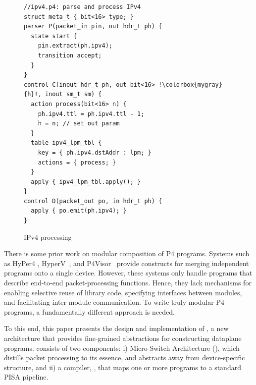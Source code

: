 \documentclass[letterpaper,twocolumn,10pt]{article}
\begin{document}
\begin{figure}[ht]
\begin{lstlisting}[frame=none, escapechar=!]
//ipv4.p4: parse and process IPv4
struct meta_t { bit<16> type; }
parser P(packet_in pin, out hdr_t ph) {
  state start {
    pin.extract(ph.ipv4);
    transition accept;
  }
}
control C(inout hdr_t ph, out bit<16> !\colorbox{mygray}{h}!, inout sm_t sm) {
  action process(bit<16> n) {
    ph.ipv4.ttl = ph.ipv4.ttl - 1;
    h = n; // set out param
  }
  table ipv4_lpm_tbl {
    key = { ph.ipv4.dstAddr : lpm; }
    actions = { process; }
  }
  apply { ipv4_lpm_tbl.apply(); }
}
control D(packet_out po, in hdr_t ph) {
  apply { po.emit(ph.ipv4); }
}
\end{lstlisting}
\caption{IPv4 processing}
\label{fig:ipv4.p4}
\end{figure}



There is some prior work on modular composition of P4 programs.
Systems such as HyPer4 \cite{Hancock:2016:HUP:2999572.2999607},
HyperV~\cite{8038396}, and
P4Visor~\cite{Zheng:2018:PLV:3281411.3281436} provide constructs for
merging independent programs onto a single device. However, these
systems only handle programs that describe end-to-end
packet-processing functions. Hence, they lack mechanisms for enabling
selective reuse of library code, specifying interfaces between
modules, and facilitating inter-module communication. To write truly
modular P4 programs, a fundamentally different approach is needed.

To this end, this paper presents the design and implementation of
\ulang, a new architecture that provides fine-grained abstractions for
constructing dataplane programs. \ulang consists of two components: i)
Micro Switch Architecture (\uarch), which distills packet processing
to its essence, and abstracts away from device-specific structure, and
ii) a compiler, \ucomp, that maps one or more \uarch programs to a
standard PISA pipeline.
\\
\end{document}
